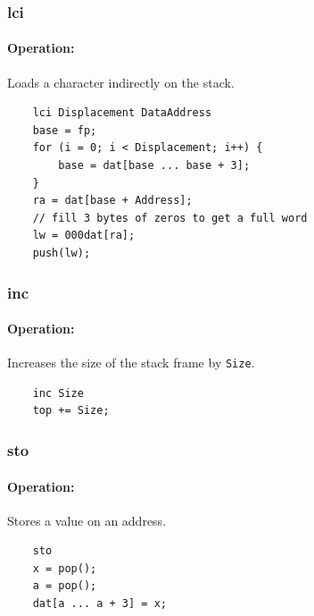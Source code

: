 \subsubsection{lci}

\paragraph{Operation:}
Loads a character indirectly on the stack.

	\begin{lstlisting}
	lci Displacement DataAddress
	base = fp;
	for (i = 0; i < Displacement; i++) {
		base = dat[base ... base + 3];
	}
	ra = dat[base + Address];
	// fill 3 bytes of zeros to get a full word
	lw = 000dat[ra];
	push(lw);
	\end{lstlisting}

\subsubsection{inc}

\paragraph{Operation:}
Increases the size of the stack frame by \lstinline$Size$.

	\begin{lstlisting}
	inc Size
	top += Size;
	\end{lstlisting}

\subsubsection{sto}

\paragraph{Operation:}
Stores a value on an address.

	\begin{lstlisting}
	sto
	x = pop();
	a = pop();
	dat[a ... a + 3] = x;
	\end{lstlisting}

